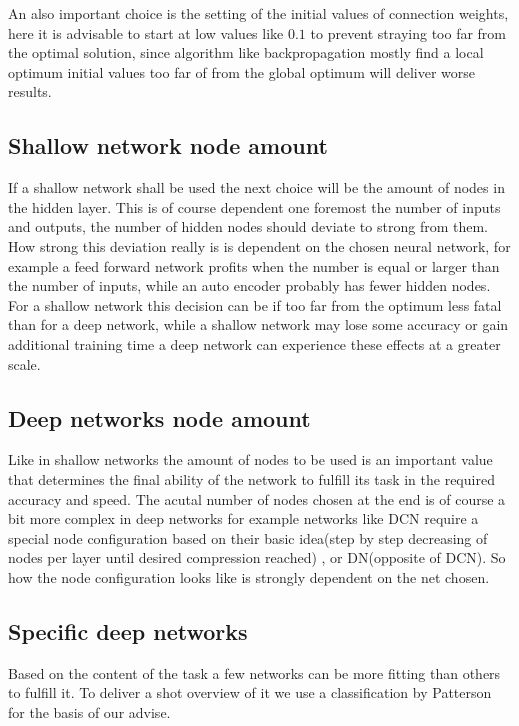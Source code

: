\documentclass[conference]{IEEEtran}
\begin{document}

An also important choice is the setting of the initial values of connection weights, here it is advisable to start at low values like $0.1$ to prevent straying too far from the optimal solution, since algorithm like backpropagation mostly find a local optimum initial values too far of from the global optimum will deliver worse results.


\subsection{Shallow network node amount}
If a shallow network shall be used the next choice will be the amount of nodes in the hidden layer. This is of course dependent one foremost the number of inputs and outputs, the number of hidden nodes should deviate to strong from them. How strong this deviation really is is dependent on the chosen neural network, for example a feed forward network profits when the number is equal or larger than the number of inputs, while an auto encoder probably has fewer hidden nodes. For a shallow network this decision can be if too far from the optimum less fatal than for a deep network, while a shallow network may lose some accuracy or gain additional training time a deep network can experience these effects at a greater scale.


\subsection{Deep networks node amount}
Like in shallow networks the amount of nodes to be used is an important value that determines the final ability of the network to fulfill its task in the required accuracy and speed. The acutal number of nodes chosen at the end is of course a bit more complex in deep networks for example networks like DCN require a special node configuration based on their basic idea(step by step decreasing of nodes per layer until desired compression reached) , or DN(opposite of DCN). So how the node configuration looks like is strongly dependent on the net chosen. 



\subsection{Specific deep networks}
Based on the content of the task a few networks can be more fitting than others to fulfill it. To deliver a shot overview of it we use a classification by Patterson\cite{PattersonGibson17} for the basis of our advise.
\end{document}
